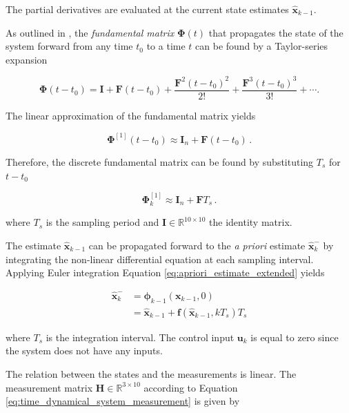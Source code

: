 \noindent
The partial derivatives are evaluated at the current state estimates $\hat{\mathbf{x}}_{k-1}$.

As outlined in \cite{zarchan2009fundamentals}, the \emph{fundamental matrix} $\bm{\Phi}(t)$ that propagates the state of the system forward from any time $t_0$ to a time $t$ can be found by a Taylor-series expansion 

\begin{equation}
  \bm{\Phi}(t-t_0) = \mathbf{I} + \mathbf{F} (t-t_0) + \frac{\mathbf{F}^2 (t-t_0)^2}{2!} +\frac{\mathbf{F}^{3} (t-t_0)^3}{3!} + \cdots.
\end{equation}
 
\noindent
The linear approximation of the fundamental matrix yields

\begin{equation}
  \bm{\Phi}^{[1]}(t-t_0) \approx \mathbf{I}_n + \mathbf{F} (t-t_0)\,.
\end{equation}

\noindent
Therefore, the discrete fundamental matrix can be found by substituting $T_s$ for $t-t_0$

\begin{equation}
  \bm{\Phi}^{[1]}_{k} \approx \mathbf{I}_{n} + \mathbf{F} T_s\,.
\end{equation}

\noindent
where $T_s$ is the sampling period and $\mathbf{I} \in \mathbb{R}^{10 \times 10}$ the identity matrix. 

The estimate $\hat{\mathbf{x}}_{k-1}$ can be propagated forward to the \emph{a priori} estimate $\hat{\mathbf{x}}^{-}_k$ by integrating the non-linear differential equation at each sampling interval. Applying Euler integration Equation \ref{eq:apriori_estimate_extended} yields

\begin{equation}\label{eq:apriori_estimate_extended_model}
\begin{split}
	\hat{\mathbf{x}}^{-}_k &= \bm{\phi}_{k-1}(\mathbf{x}_{k-1}, 0) \\
	&= \hat{\mathbf{x}}_{k-1} + \mathbf{f}(\hat{\mathbf{x}}_{k-1}, kT_s)T_s
\end{split}  
\end{equation}

\noindent
where $T_s$ is the integration interval. The control input $\mathbf{u}_k$ is equal to zero since the system does not have any inputs.

The relation between the states and the measurements is linear. The measurement matrix $\mathbf{H} \in \mathbb{R}^{3 \times 10}$ according to Equation \ref{eq:time_dynamical_system_measurement} is given by 

